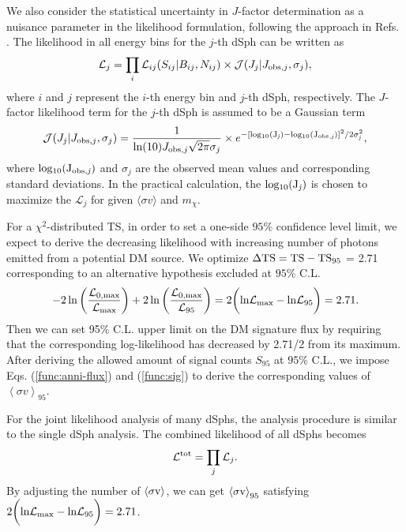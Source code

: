 \documentclass[12pt,aps,prd,amsmath,amssymb,showpacs,floats,floatfix,nofootinbib]{revtex4-1}
\begin{document}
We also consider the statistical uncertainty in $J$-factor determination as a nuisance parameter in the likelihood formulation, following the approach in Refs. \cite{Ackermann:2015zua,Fermi-LAT:2016uux}.
The likelihood in all energy bins for the $j$-th dSph can be written as
\begin{equation}
\mathcal{L}_{j}=\prod_{i}\mathcal{L}_{ij}(S_{ij}|B_{ij},N_{ij})\times\mathcal{J}(J_{j}|J_{{\rm obs},j},\sigma_{j}),
\end{equation}
where $i$ and $j$ represent the $i$-th energy bin and $j$-th dSph, respectively. The $J$-factor likelihood term for the $j$-th dSph is assumed to be a Gaussian term
\begin{equation}
\mathcal{J}(J_{j}|J_{{\rm obs},j},\sigma_{j})=\dfrac{1}{{\rm ln}(10)J_{{\rm obs},j}\sqrt{2\pi}\sigma_{j}}\times e^{-[\rm log_{10}(J_{\it j})-log_{10}(J_{obs,{\it j}})]^{2}/2\sigma_{\it j}^{2}},
\end{equation}
where $\rm log_{10}(J_{obs,{\it j}})$ and $\sigma_{j}$ are the observed mean values and corresponding standard deviations. In the practical calculation, the $\rm log_{10}(J_{\it j})$ is chosen to maximize the $\mathcal{L}_{j}$ for given $\langle\sigma v\rangle$ and $m_{\chi}$.

For a $\chi^{2}$-distributed TS, in order to set a one-side $95\%$ confidence level limit, we expect to derive the decreasing likelihood with increasing number of photons emitted from a potential DM source.
We optimize $\rm \Delta TS=TS-TS_{95}$ = 2.71 corresponding to an alternative hypothesis excluded at $95\%$ C.L. \cite{Rolke:2004mj}
\begin{equation}\label{func:95-limit}
  -2\ln\bigg(\frac{\mathcal{L}_{0,{\rm max}}}{\mathcal{L}_{\rm max}}\bigg)+2\ln\bigg(\frac{\mathcal{L}_{0,{\rm max}}}{\mathcal{L}_{95}}\bigg)=2\bigg(\rm ln\mathcal{L}_{max}-ln\mathcal{L}_{95}\bigg)=2.71.
\end{equation}
Then we can set 95\% C.L. upper limit on the DM signature flux by requiring that the corresponding log-likelihood has decreased by 2.71/2 from its maximum.
After deriving the allowed amount of signal counts $S_{95}$ at $95\%$ C.L., we impose Eqs. (\ref{func:anni-flux}) and (\ref{func:sig}) to derive the corresponding values of $\left\langle \sigma v\right\rangle_{95} $.

For the joint likelihood analysis of many dSphs, the analysis procedure is similar to the single dSph analysis. The combined likelihood of all dSphs becomes
\begin{equation}
\mathcal{L}^{\rm tot}=\prod_{j}\mathcal{L}_{j}.
\end{equation}
By adjusting the number of $\rm \left\langle \sigma v\right\rangle$, we can get $\rm \left\langle \sigma v\right\rangle_{95}$ satisfying $2\bigg(\rm ln\mathcal{L}_{max}-ln\mathcal{L}_{95}\bigg)=2.71$.
\end{document}
